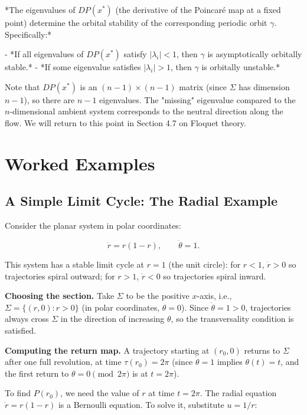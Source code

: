 \begin{proposition}\label{prop:4.6.}
*The eigenvalues of $DP(x^*)$ (the derivative of the Poincaré map at a fixed point) determine the orbital stability of the corresponding periodic orbit $\gamma$. Specifically:*

- *If all eigenvalues of $DP(x^*)$ satisfy $|\lambda_i| < 1$, then $\gamma$ is asymptotically orbitally stable.*
- *If some eigenvalue satisfies $|\lambda_i| > 1$, then $\gamma$ is orbitally unstable.*

Note that $DP(x^*)$ is an $(n-1) \times (n-1)$ matrix (since $\Sigma$ has dimension $n-1$), so there are $n-1$ eigenvalues. The "missing" eigenvalue compared to the $n$-dimensional ambient system corresponds to the neutral direction along the flow. We will return to this point in Section 4.7 on Floquet theory.
\end{proposition}


\section{Worked Examples}\label{sec:4.3}

\subsection{A Simple Limit Cycle: The Radial Example}\label{sec:4.3.1}

Consider the planar system in polar coordinates:

\[
\dot{r} = r(1 - r), \qquad \dot{\theta} = 1.
\]

This system has a stable limit cycle at $r = 1$ (the unit circle): for $r < 1$, $\dot{r} > 0$ so trajectories spiral outward; for $r > 1$, $\dot{r} < 0$ so trajectories spiral inward.

\textbf{Choosing the section.} Take $\Sigma$ to be the positive $x$-axis, i.e., $\Sigma = \{(r, 0) : r > 0\}$ (in polar coordinates, $\theta = 0$). Since $\dot{\theta} = 1 > 0$, trajectories always cross $\Sigma$ in the direction of increasing $\theta$, so the transversality condition is satisfied.

\textbf{Computing the return map.} A trajectory starting at $(r_0, 0)$ returns to $\Sigma$ after one full revolution, at time $\tau(r_0) = 2\pi$ (since $\dot{\theta} = 1$ implies $\theta(t) = t$, and the first return to $\theta = 0 \pmod{2\pi}$ is at $t = 2\pi$).

To find $P(r_0)$, we need the value of $r$ at time $t = 2\pi$. The radial equation $\dot{r} = r(1 - r)$ is a Bernoulli equation. To solve it, substitute $u = 1/r$:

